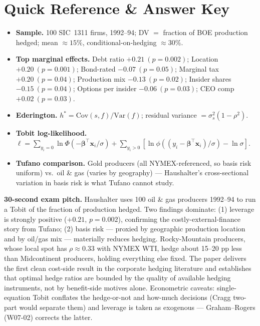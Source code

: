 \documentclass[11pt]{article}
\begin{document}
\section*{Quick Reference \& Answer Key}
\begin{answerbox}
\begin{itemize}
\item \textbf{Sample.} 100 SIC~1311 firms, 1992--94; DV $=$ fraction of BOE production hedged; mean $\approx 15\%$, conditional-on-hedging $\approx 30\%$.
\item \textbf{Top marginal effects.} Debt ratio $+0.21\ (p=0.002)$; Location $+0.20\ (p=0.001)$; Bond-rated $-0.07\ (p=0.05)$; Marginal tax $+0.20\ (p=0.04)$; Production mix $-0.13\ (p=0.02)$; Insider shares $-0.15\ (p=0.04)$; Options per insider $-0.06\ (p=0.03)$; CEO comp $+0.02\ (p=0.03)$.
\item \textbf{Ederington.} $h^*=\text{Cov}(s,f)/\text{Var}(f)$; residual variance $=\sigma_s^2(1-\rho^2)$.
\item \textbf{Tobit log-likelihood.} $\ell = \sum_{y_i=0}\ln\Phi(-\bm\beta^\top\mathbf x_i/\sigma) + \sum_{y_i>0} [\ln\phi((y_i-\bm\beta^\top \mathbf x_i)/\sigma)-\ln\sigma]$.
\item \textbf{Tufano comparison.} Gold producers (all NYMEX-referenced, so basis risk uniform) vs.\ oil \& gas (varies by geography) --- Haushalter's cross-sectional variation in basis risk is what Tufano cannot study.
\end{itemize}
\end{answerbox}

\begin{keybox}
\textbf{30-second exam pitch.} Haushalter uses 100 oil \& gas producers 1992--94 to run a Tobit of the fraction of production hedged. Two findings dominate: (1) leverage is strongly positive ($+0.21$, $p=0.002$), confirming the costly-external-finance story from Tufano; (2) basis risk --- proxied by geographic production location and by oil/gas mix --- materially reduces hedging. Rocky-Mountain producers, whose local spot has $\rho\approx 0.33$ with NYMEX WTI, hedge about 15--20 pp less than Midcontinent producers, holding everything else fixed. The paper delivers the first clean cost-side result in the corporate hedging literature and establishes that optimal hedge ratios are bounded by the quality of available hedging instruments, not by benefit-side motives alone. Econometric caveats: single-equation Tobit conflates the hedge-or-not and how-much decisions (Cragg two-part would separate them) and leverage is taken as exogenous --- Graham--Rogers (W07-02) corrects the latter.
\end{keybox}
\end{document}
